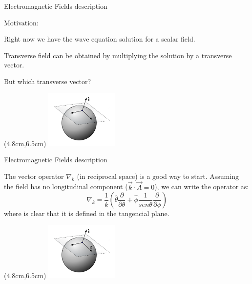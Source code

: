 \documentclass[10pt]{beamer}
\begin{document}

\begin{frame}[fragile]{Electromagnetic Fields description}

Motivation: 
  \begin{center}
  Right now we have the wave equation solution for a scalar field.

  Transverse field can be obtained by multiplying the solution by a transverse vector.

  \alert{But which transverse vector?}
  \end{center}
        \begin{textblock*}{3cm}(4.8cm,6.5cm)
            \includegraphics[width=3.6cm]{tangesfk}
        \end{textblock*}

\end{frame}


\begin{frame}[fragile]{Electromagnetic Fields description}

The vector operator $\nabla_k$ (in reciprocal space) is a good way to start. Assuming the field has no longitudinal component ($\vec{k} \cdot \vec{A}=0$), we can write the operator as:
      \begin{equation*}
          \nabla_k = \frac{1}{k}\left(\hat{\theta}\frac{\partial}{\partial\theta} + \hat{\phi}\frac{1}{sen\theta}\frac{\partial}{\partial\phi}\right)
      \end{equation*}
where is clear that it is defined in the tangencial plane.
        \begin{textblock*}{3cm}(4.8cm,6.5cm)
            \includegraphics[width=3.6cm]{tangesfkd}
        \end{textblock*}
\end{frame}
\end{document}
